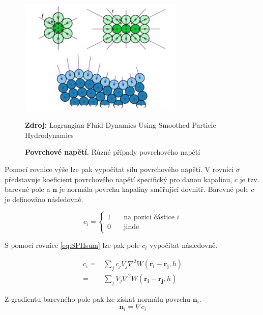 \begin{figure}[hbt]
	\centering
	\captionsetup{justification=centering}
	\includegraphics[width=0.7\textwidth]{obrazky-figures/SurfTens.png}
	\caption{\textbf{Povrchové napětí.} Různé případy povrchového napětí}
	\textbf{Zdroj: } Lagrangian Fluid Dynamics Using Smoothed Particle Hydrodynamics \cite{KelagerSPH}
	\label{fig:SurTen}
\end{figure}

Pomocí rovnice výše lze pak vypočítat sílu povrchového napětí. V rovnici $\sigma$ představuje koeficient povrchového napětí specifický pro danou kapalinu, $c$ je tzv. barevné pole a $\mathbf{n}$ je normála povrchu kapaliny směřující dovnitř. Barevné pole $c$ je definováno následovně.

\begin{equation}
    c_i = 
    \begin{cases}
     1 & \quad  \text{na pozici částice } i \\
     0 & \quad  \text{jinde}
    \end{cases}
\end{equation}

S pomocí rovnice \ref{eq:SPHsum} lze pak pole $c_i$ vypočítat následovně.

\begin{equation}
    \begin{split}
        c_i =   & \sum_j c_j V_j \nabla^2 W(\mathbf{r_i} - \mathbf{r_j},h) \\
            =   & \sum_j V_j \nabla^2 W(\mathbf{r_i} - \mathbf{r_j},h)
    \end{split}
    \label{eq:ColorField}
\end{equation}

Z gradientu barevného pole pak lze získat normálu povrchu $\mathbf{n}_i$.
\begin{equation}
    \mathbf{n}_i = \nabla c_i
    \label{eq:SurfNormal}
\end{equation}

